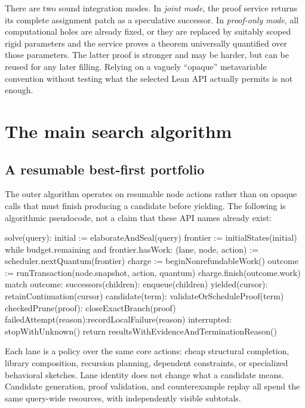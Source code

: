 \documentclass[11pt,letterpaper]{article}
\theoremstyle{definition}
\theoremstyle{remark}
\begin{document}
There are two sound integration modes. In \emph{joint mode}, the proof service returns its complete assignment patch as a speculative successor. In \emph{proof-only mode}, all computational holes are already fixed, or they are replaced by suitably scoped rigid parameters and the service proves a theorem universally quantified over those parameters. The latter proof is stronger and may be harder, but can be reused for any later filling. Relying on a vaguely ``opaque'' metavariable convention without testing what the selected Lean API actually permits is not enough.

\section{The main search algorithm}
\label{sec:search}

\subsection{A resumable best-first portfolio}

The outer algorithm operates on resumable node actions rather than on opaque calls that must finish producing a candidate before yielding. The following is algorithmic pseudocode, not a claim that these API names already exist:

\begin{code}
solve(query):
    initial := elaborateAndSeal(query)
    frontier := initialStates(initial)
    while budget.remaining and frontier.hasWork:
        (lane, node, action) := scheduler.nextQuantum(frontier)
        charge := beginNonrefundableWork()
        outcome := runTransaction(node.snapshot, action, quantum)
        charge.finish(outcome.work)
        match outcome:
          successors(children): enqueue(children)
          yielded(cursor):      retainContinuation(cursor)
          candidate(term):      validateOrScheduleProof(term)
          checkedPrune(proof):  closeExactBranch(proof)
          failedAttempt(reason):recordLocalFailure(reason)
          interrupted:          stopWithUnknown()
    return resultsWithEvidenceAndTerminationReason()
\end{code}

Each lane is a policy over the same core actions: cheap structural completion, library composition, recursion planning, dependent constraints, or specialized behavioral sketches. Lane identity does not change what a candidate means. Candidate generation, proof validation, and counterexample replay all spend the same query-wide resources, with independently visible subtotals.
\end{document}
